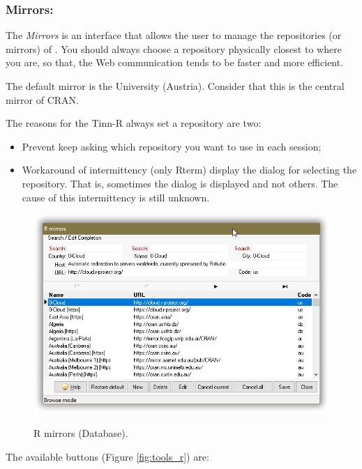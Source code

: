 \subsubsection{Mirrors:}

The \textit{Mirrors} is an interface that allows the user to manage the repositories (or mirrors) of \RR{}.
You should always choose a repository physically closest to where you are,
so that, the Web communication tends to be faster and more efficient.

The default mirror is the University 
(Austria). Consider that this is the central mirror of CRAN.

The reasons for the Tinn-R always set a repository are two:
\begin {itemize}
   \item Prevent \RR{} keep asking which repository you want to use in each session;
   \item Workaround of intermittency (only Rterm) display the dialog for selecting the repository.
    That is, sometimes the dialog is displayed and not others. The cause of this intermittency is still unknown.
\end {itemize}

\begin{figure}[H]
  \includegraphics[scale=0.35]{./res/mirrors_dlg.png}\\
  \caption{R mirrors (Database).}
  \label{fig:mirrors_dlg_2}
\end{figure}

The available buttons
(Figure \ref{fig:tools_r})
are:

